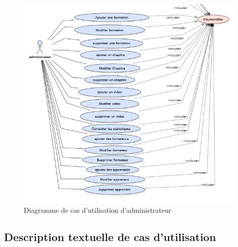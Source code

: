 \begin{figure}[H]
    \centering
    \includegraphics[width=13cm]{Figures/administrateur.PNG}
    \caption{Diagramme de cas d’utilisation d'administrateur}
\end{figure}

\subsection{Description textuelle de cas d’utilisation}

